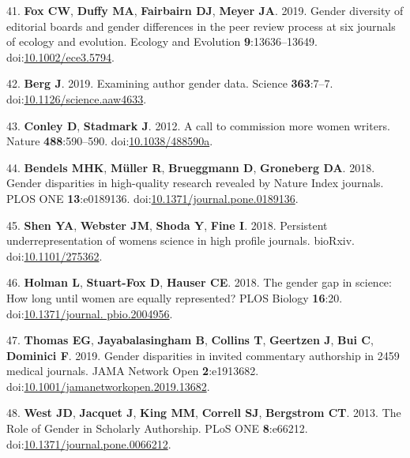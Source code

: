 \documentclass[11pt,]{article}
\begin{document}
\hypertarget{ref-Fox2019}{}
41. \textbf{Fox CW}, \textbf{Duffy MA}, \textbf{Fairbairn DJ},
\textbf{Meyer JA}. 2019. Gender diversity of editorial boards and gender
differences in the peer review process at six journals of ecology and
evolution. Ecology and Evolution \textbf{9}:13636--13649.
doi:\href{https://doi.org/10.1002/ece3.5794}{10.1002/ece3.5794}.

\hypertarget{ref-berg_examining_2019}{}
42. \textbf{Berg J}. 2019. Examining author gender data. Science
\textbf{363}:7--7.
doi:\href{https://doi.org/10.1126/science.aaw4633}{10.1126/science.aaw4633}.

\hypertarget{ref-conley_call_2012-1}{}
43. \textbf{Conley D}, \textbf{Stadmark J}. 2012. A call to commission
more women writers. Nature \textbf{488}:590--590.
doi:\href{https://doi.org/10.1038/488590a}{10.1038/488590a}.

\hypertarget{ref-bendels_gender_2018}{}
44. \textbf{Bendels MHK}, \textbf{Müller R}, \textbf{Brueggmann D},
\textbf{Groneberg DA}. 2018. Gender disparities in high-quality research
revealed by Nature Index journals. PLOS ONE \textbf{13}:e0189136.
doi:\href{https://doi.org/10.1371/journal.pone.0189136}{10.1371/journal.pone.0189136}.

\hypertarget{ref-Shen275362}{}
45. \textbf{Shen YA}, \textbf{Webster JM}, \textbf{Shoda Y},
\textbf{Fine I}. 2018. Persistent underrepresentation of womens science
in high profile journals. bioRxiv.
doi:\href{https://doi.org/10.1101/275362}{10.1101/275362}.

\hypertarget{ref-holman_gender_2018}{}
46. \textbf{Holman L}, \textbf{Stuart-Fox D}, \textbf{Hauser CE}. 2018.
The gender gap in science: How long until women are equally represented?
PLOS Biology \textbf{16}:20.
doi:\href{https://doi.org/10.1371/journal.\%20pbio.2004956}{10.1371/journal. pbio.2004956}.

\hypertarget{ref-Thomas2019}{}
47. \textbf{Thomas EG}, \textbf{Jayabalasingham B}, \textbf{Collins T},
\textbf{Geertzen J}, \textbf{Bui C}, \textbf{Dominici F}. 2019. Gender
disparities in invited commentary authorship in 2459 medical journals.
JAMA Network Open \textbf{2}:e1913682.
doi:\href{https://doi.org/10.1001/jamanetworkopen.2019.13682}{10.1001/jamanetworkopen.2019.13682}.

\hypertarget{ref-west_role_2013}{}
48. \textbf{West JD}, \textbf{Jacquet J}, \textbf{King MM},
\textbf{Correll SJ}, \textbf{Bergstrom CT}. 2013. The Role of Gender in
Scholarly Authorship. PLoS ONE \textbf{8}:e66212.
doi:\href{https://doi.org/10.1371/journal.pone.0066212}{10.1371/journal.pone.0066212}.
\end{document}
